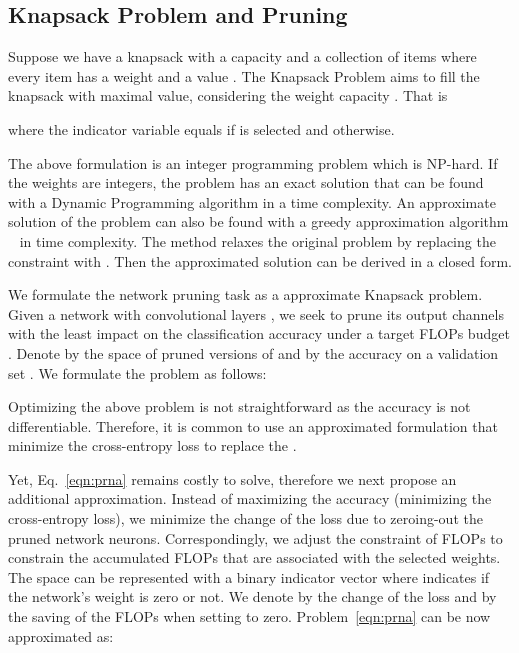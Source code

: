\documentclass{article}
\begin{document}
\vspace{-5pt} 
\subsection{Knapsack Problem and Pruning}
\vspace{-5pt} 
Suppose we have a knapsack with a capacity  and a collection of  items  where every item  has a weight  and a value . 
The Knapsack Problem aims to fill the knapsack with maximal value, considering the weight capacity . 
That is

where the indicator variable  equals  if  is selected and  otherwise. 

The above formulation is an integer programming problem which is NP-hard. 
If the weights  are integers, the problem has an exact solution that can be found with a Dynamic Programming algorithm in a  time complexity. An approximate solution of the problem can also be found with a greedy approximation algorithm ~\cite{knapsack} in  time complexity. The method relaxes the original problem by replacing the constraint   with  . Then the approximated solution can be derived in a closed form.




We formulate the network pruning task as a approximate Knapsack problem. Given a network  with convolutional layers , we seek to prune its output channels with the least impact on the classification accuracy under a target FLOPs budget . Denote by  the space of pruned versions of  and by  the accuracy on a validation set . We formulate the problem as follows:


Optimizing the above problem is not straightforward as the accuracy  is not differentiable.
Therefore, it is common to use an approximated formulation that minimize the cross-entropy loss to replace the .


Yet, Eq.~\eqref{eqn:prna} remains costly to solve, therefore we next propose an additional approximation. Instead of maximizing the accuracy (minimizing the cross-entropy loss), we minimize the change of the loss due to zeroing-out the pruned network neurons. 
Correspondingly, we adjust the constraint of FLOPs to 
constrain the accumulated FLOPs that are associated with the selected weights. 
The space  can be represented with a binary indicator vector  where  indicates if the network's weight  is zero or not. We denote by  the change of the loss  and by  the saving of the FLOPs when setting  to zero.  
Problem~\eqref{eqn:prna} can be now approximated as:
\end{document}
